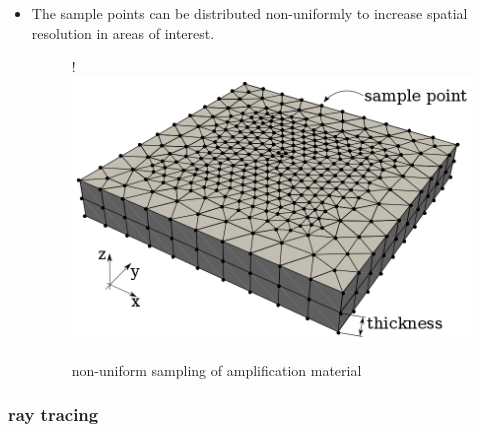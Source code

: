 \begin{itemize}
  \item The sample points can be distributed non-uniformly to increase
    spatial resolution in areas of interest.

    \begin{figure}[H]
      \centerline{
         {!} {\includegraphics{graphics/samples_reduced.png}}
      }
      \caption{non-uniform sampling of amplification material}
      \label{graphic:samples_reduced}
    \end{figure}

\end{itemize}



\subsubsection{ray tracing}

